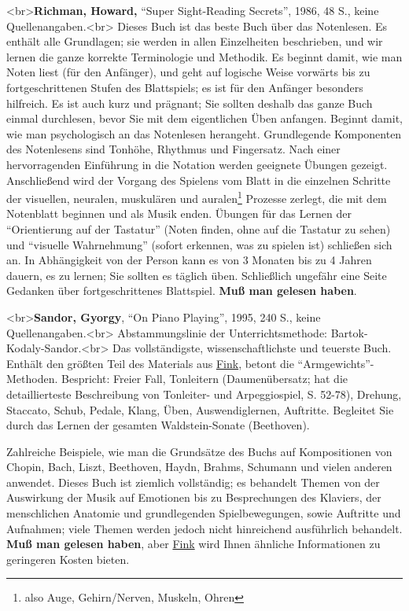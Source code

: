 <br>\textbf{Richman, Howard,} \enquote{Super Sight-Reading Secrets}, 1986, 48 S., keine Quellenangaben.<br>
Dieses Buch ist das beste Buch über das Notenlesen.
Es enthält alle Grundlagen; sie werden in allen Einzelheiten beschrieben, und wir lernen die ganze korrekte Terminologie und Methodik.
Es beginnt damit, wie man Noten liest (für den Anfänger), und geht auf logische Weise vorwärts bis zu fortgeschrittenen Stufen des Blattspiels; es ist für den Anfänger besonders hilfreich.
Es ist auch kurz und prägnant; Sie sollten deshalb das ganze Buch einmal durchlesen, bevor Sie mit dem eigentlichen Üben anfangen.
Beginnt damit, wie man psychologisch an das Notenlesen herangeht.
Grundlegende Komponenten des Notenlesens sind Tonhöhe, Rhythmus und Fingersatz.
Nach einer hervorragenden Einführung in die Notation werden geeignete Übungen gezeigt.
Anschließend wird der Vorgang des Spielens vom Blatt in die einzelnen Schritte der visuellen, neuralen, muskulären und auralen\footnote{also Auge, Gehirn/Nerven, Muskeln, Ohren} Prozesse zerlegt, die mit dem Notenblatt beginnen und als Musik enden.
Übungen für das Lernen der \enquote{Orientierung auf der Tastatur} (Noten finden, ohne auf die Tastatur zu sehen) und \enquote{visuelle Wahrnehmung} (sofort erkennen, was zu spielen ist) schließen sich an.
In Abhängigkeit von der Person kann es von 3 Monaten bis zu 4 Jahren dauern, es zu lernen; Sie sollten es täglich üben.
Schließlich ungefähr eine Seite Gedanken über fortgeschrittenes Blattspiel.
\textbf{Muß man gelesen haben}.


\hypertarget{Sandor}{}

<br>\textbf{Sandor, Gyorgy}, \enquote{On Piano Playing}, 1995, 240 S., keine Quellenangaben.<br>  Abstammungslinie der Unterrichtsmethode: Bartok-Kodaly-Sandor.<br>  Das vollständigste, wissenschaftlichste und teuerste Buch.
Enthält den größten Teil des Materials aus \hyperlink{Fink}{Fink}, betont die \enquote{Armgewichts}-Methoden.
Bespricht: Freier Fall, Tonleitern (Daumenübersatz; hat die detaillierteste Beschreibung von Tonleiter- und Arpeggiospiel, S. 52-78), Drehung, Staccato, Schub, Pedale, Klang, Üben, Auswendiglernen, Auftritte.
Begleitet Sie durch das Lernen der gesamten Waldstein-Sonate (Beethoven).

Zahlreiche Beispiele, wie man die Grundsätze des Buchs auf Kompositionen von Chopin, Bach, Liszt, Beethoven, Haydn, Brahms, Schumann und vielen anderen anwendet.
Dieses Buch ist ziemlich vollständig; es behandelt Themen von der Auswirkung der Musik auf Emotionen bis zu Besprechungen des Klaviers, der menschlichen Anatomie und grundlegenden Spielbewegungen, sowie Auftritte und Aufnahmen; viele Themen werden jedoch nicht hinreichend ausführlich behandelt.
\textbf{Muß man gelesen haben}, aber \hyperlink{Fink}{Fink} wird Ihnen ähnliche Informationen zu geringeren Kosten bieten.


